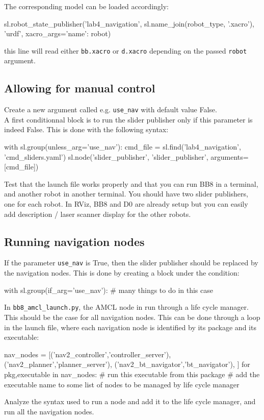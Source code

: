 \documentclass{ecnreport}
\begin{document}
The corresponding model can be loaded accordingly:
\begin{pythoncodelarge}
sl.robot_state_publisher('lab4_navigation', 
                          sl.name_join(robot_type, '.xacro'),
                         'urdf', xacro_args={'name': robot})
\end{pythoncodelarge}this line will read either \texttt{bb.xacro} or \texttt{d.xacro} depending on the passed \texttt{robot} argument. 

\subsection{Allowing for manual control}

Create a new argument called e.g. \texttt{use\_nav} with default value False. \\

A first conditionnal block is to run the slider publisher only if this parameter is indeed False. This is done with the following syntax:
\begin{pythoncodelarge}
with sl.group(unless_arg='use_nav'):
    cmd_file = sl.find('lab4_navigation', 'cmd_sliders.yaml')
    sl.node('slider_publisher', 'slider_publisher', arguments=[cmd_file])
\end{pythoncodelarge}

Test that the launch file works properly and that you can run BB8 in a terminal, and another robot in another terminal. You should have two slider publishers, one for each robot. In RViz, BB8 and D0 are already setup but you can easily add description / laser scanner display for the other robots.

\subsection{Running navigation nodes}

If the parameter \texttt{use\_nav} is True, then the slider publisher should be replaced by the navigation nodes. This is done by creating a block under the condition:
\begin{pythoncodelarge}
with sl.group(if_arg='use_nav'):
    # many things to do in this case
\end{pythoncodelarge}

In \texttt{bb8\_amcl\_launch.py}, the AMCL node in run through a life cycle manager. This should be the case for all navigation nodes. This can be done through a loop in the launch file, where each navigation node is identified by its package and its executable:
\begin{pythoncodelarge}
nav_nodes = [('nav2_controller','controller_server'), 
        ('nav2_planner','planner_server'),
        ('nav2_bt_navigator','bt_navigator'),
        ]
for pkg,executable in nav_nodes:
    # run this executable from this package
    # add the executable name to some list of nodes to be managed by life cycle manager
\end{pythoncodelarge}Analyze the syntax used to run a node and add it to the life cycle manager, and run all the navigation nodes.\\
\end{document}
